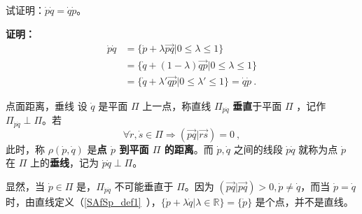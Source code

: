 \begin{example}{}
试证明：$\dot p\dot q=\dot q\dot p$。

\textbf{证明：}
\begin{equation}
\begin{aligned}
\dot p\dot q&=\{\dot p+\lambda\overrightarrow{pq}|0\leq\lambda\leq1\}\\
&=\{\dot q+(1-\lambda)\overrightarrow{qp}|0\leq\lambda\leq1\}\\
&=\{\dot q+\lambda'\overrightarrow{qp}|0\leq\lambda'\leq1\}=\dot q\dot p~.
\end{aligned}
\end{equation}
\end{example}
\begin{definition}{点面距离，垂线}
设 $\dot q$ 是平面 $\Pi$ 上一点，称直线 $\Pi_{\dot p\dot q}$ \textbf{垂直}于平面 $\Pi$ ，记作 $\Pi_{\dot p\dot q}\perp\Pi$。若
\begin{equation}
\forall \dot r,\dot s\in\Pi\Rightarrow (\overrightarrow{pq}|\overrightarrow{rs})=0~,
\end{equation}
此时，称 $\rho(\dot p,\dot q)$ 是\textbf{点 $\dot p$ 到平面 $\Pi$ 的距离}。而 $\dot p,\dot q$ 之间的线段 $\dot p\dot q$ 就称为点 $\dot p$ 在 $\Pi$ 上的\textbf{垂线}，记为 $\dot p\dot q\perp\Pi$。
\end{definition}
显然，当 $\dot p\in\Pi$ 是，$\Pi_{\dot p\dot q}$ 不可能垂直于 $\Pi$。因为 $(\overrightarrow{pq}|\overrightarrow{pq})>0,\dot p\neq \dot q$，而当 $\dot p=\dot q$ 时，由直线定义（\autoref{SAfSp_def1}~），$\{\dot p+\lambda\dot q|\lambda\in \mathbb R\}=\{\dot p\}$ 是个点，并不是直线。